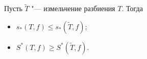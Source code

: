 \label{imel}
 	Пусть $\widetilde T$ "--- измельчение разбиения $T$. Тогда
 	\begin{itemize}
 	  \item $s_*(T,f)\leq s_*(\widetilde T,f)$;
 	  \item $S^*(T,f)\geq S^*(\widetilde T,f)$.
 	\end{itemize}
 
